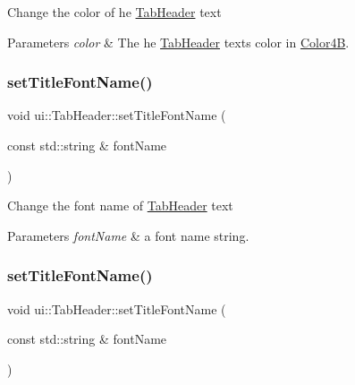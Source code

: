 Change the color of he \hyperlink{classui_1_1TabHeader}{Tab\+Header} text 
\begin{DoxyParams}{Parameters}
{\em color} & The he \hyperlink{classui_1_1TabHeader}{Tab\+Header} text\textquotesingle{}s color in \hyperlink{structColor4B}{Color4B}. \\
\hline
\end{DoxyParams}
\mbox{\label{classui_1_1TabHeader_aae4fb72cc0d477b482c98ff34d7aaf82}} 
\subsubsection{\texorpdfstring{set\+Title\+Font\+Name()}{setTitleFontName()}\hspace{0.1cm}{\footnotesize\ttfamily [1/2]}}
{\footnotesize\ttfamily void ui\+::\+Tab\+Header\+::set\+Title\+Font\+Name (\begin{DoxyParamCaption}\item[{const std\+::string \&}]{font\+Name }\end{DoxyParamCaption})}

Change the font name of \hyperlink{classui_1_1TabHeader}{Tab\+Header} text 
\begin{DoxyParams}{Parameters}
{\em font\+Name} & a font name string. \\
\hline
\end{DoxyParams}
\mbox{\label{classui_1_1TabHeader_aae4fb72cc0d477b482c98ff34d7aaf82}} 
\subsubsection{\texorpdfstring{set\+Title\+Font\+Name()}{setTitleFontName()}\hspace{0.1cm}{\footnotesize\ttfamily [2/2]}}
{\footnotesize\ttfamily void ui\+::\+Tab\+Header\+::set\+Title\+Font\+Name (\begin{DoxyParamCaption}\item[{const std\+::string \&}]{font\+Name }\end{DoxyParamCaption})}

